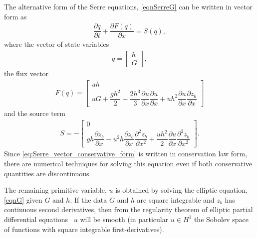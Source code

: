 \documentclass[preprint,sort&compress,1p]{article}
\begin{document}
The alternative form of the Serre equations, \eqref{eqnSerreG} can be written in vector form as
\begin{gather}\label{eq:Serre_vector_conservative_form}
\dfrac{\partial {q}}{\partial t} + \dfrac{\partial {F}({q})}{\partial x} = {S}({q}),
\end{gather}
where the vector of state variables
\begin{gather}%
{q} = \left[ \begin{array}{c} h \\ G
\end{array} \right],
\end{gather}
the flux vector
\begin{gather}%
{F}({q}) = \left[ \begin{array}{c} uh \\
uG + \dfrac{gh^2}{2} - \dfrac{2h^3}{3} \dfrac{\partial u}{\partial x} \dfrac{\partial u}{\partial x} + uh^2 \dfrac{\partial u}{\partial x} \dfrac{\partial z_b}{\partial x}
\end{array} \right]
\end{gather}
and the source term
\begin{align}
{S} = - \left [ \begin{array}{c} 0 \\
gh \dfrac{\partial z_b}{\partial x} - u^2 h \dfrac{\partial z_b}{\partial x}\dfrac{\partial ^2 z_b}{\partial x^2} + \dfrac{u h^2}{2} \dfrac{\partial u}{\partial x} \dfrac{\partial^2 z_b}{\partial x^2}
\end{array} \right ].
\end{align}
Since \eqref{eq:Serre_vector_conservative_form} is written in conservation law form, there are numerical techniques for solving this equation even if both conservative quantities are discontinuous.


The remaining primitive variable, $u$ is obtained by solving the elliptic equation, \eqref{eqnG} given $G$ and $h$. If the data $G$ and $h$ are square integrable and $z_b$ has continuous second derivatives,  then from the regularity theorem of elliptic partial differential equations~\cite{Evans-L-1997} $u$ will be smooth (in particular $u \in H^1$ the Sobolev space of functions with square integrable first-derivatives).

\end{document}
